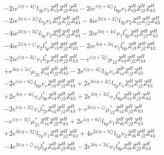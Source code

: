 \begin{align}
 &-2 i e^{i \Big(\eta +4 \zeta \Big)} l_{3p} v_1 Z_{{i 3}}^{H} Z_{{j 2}}^{H} Z_{{k 3}}^{H} -2 i e^{i \Big(\eta +6 \zeta \Big)} l_{6p} v_1 Z_{{i 3}}^{H} Z_{{j 2}}^{H} Z_{{k 3}}^{H} \nonumber \\ 
 &-2 i e^{3 i \Big(\eta +2 \zeta \Big)} l_{7p} v_1 Z_{{i 3}}^{H} Z_{{j 2}}^{H} Z_{{k 3}}^{H} -4 i e^{2 i \Big(\eta +2 \zeta \Big)} l_{2p} v_2 Z_{{i 3}}^{H} Z_{{j 2}}^{H} Z_{{k 3}}^{H} \nonumber \\ 
 &-4 i e^{2 i \Big(\eta +3 \zeta \Big)} l_{5p} v_2 Z_{{i 3}}^{H} Z_{{j 2}}^{H} Z_{{k 3}}^{H} -2 i e^{3 i \eta +4 i \zeta } v_1 l_{3p}^* Z_{{i 3}}^{H} Z_{{j 2}}^{H} Z_{{k 3}}^{H} \nonumber \\ 
 &-4 i e^{2 i \Big(\eta +\zeta \Big)} v_2 l_{5p}^* Z_{{i 3}}^{H} Z_{{j 2}}^{H} Z_{{k 3}}^{H} -2 i e^{3 i \eta +2 i \zeta } v_1 l_{6p}^* Z_{{i 3}}^{H} Z_{{j 2}}^{H} Z_{{k 3}}^{H} \nonumber \\ 
 &-2 i e^{i \Big(\eta +2 \zeta \Big)} v_1 l_{7p}^* Z_{{i 3}}^{H} Z_{{j 2}}^{H} Z_{{k 3}}^{H} - e^{i \Big(\eta +5 \zeta \Big)} \mu_{12} Z_{{i 4}}^{H} Z_{{j 2}}^{H} Z_{{k 3}}^{H} \nonumber \\ 
 &+e^{3 i \eta +5 i \zeta } \mu_{21} Z_{{i 4}}^{H} Z_{{j 2}}^{H} Z_{{k 3}}^{H} -2 e^{i \Big(\eta +4 \zeta \Big)} l_{3p} v_s Z_{{i 4}}^{H} Z_{{j 2}}^{H} Z_{{k 3}}^{H} \nonumber \\ 
 &-2 e^{i \Big(\eta +6 \zeta \Big)} l_{6p} v_s Z_{{i 4}}^{H} Z_{{j 2}}^{H} Z_{{k 3}}^{H} +2 e^{3 i \Big(\eta +2 \zeta \Big)} l_{7p} v_s Z_{{i 4}}^{H} Z_{{j 2}}^{H} Z_{{k 3}}^{H} \nonumber \\ 
 &+2 e^{3 i \eta +4 i \zeta } v_s l_{3p}^* Z_{{i 4}}^{H} Z_{{j 2}}^{H} Z_{{k 3}}^{H} +2 e^{3 i \eta +2 i \zeta } v_s l_{6p}^* Z_{{i 4}}^{H} Z_{{j 2}}^{H} Z_{{k 3}}^{H} \nonumber \\ 
 &-2 e^{i \Big(\eta +2 \zeta \Big)} v_s l_{7p}^* Z_{{i 4}}^{H} Z_{{j 2}}^{H} Z_{{k 3}}^{H} +e^{3 i \Big(\eta +\zeta \Big)} \mu_{12}^* Z_{{i 4}}^{H} Z_{{j 2}}^{H} Z_{{k 3}}^{H} \nonumber \\ 
 &- e^{i \Big(\eta +3 \zeta \Big)} \mu_{21}^* Z_{{i 4}}^{H} Z_{{j 2}}^{H} Z_{{k 3}}^{H} +2 e^{i \Big(\eta +6 \zeta \Big)} l_{6p} v_1 Z_{{i 6}}^{H} Z_{{j 2}}^{H} Z_{{k 3}}^{H} \nonumber \\ 
 &+2 e^{3 i \Big(\eta +2 \zeta \Big)} l_{7p} v_1 Z_{{i 6}}^{H} Z_{{j 2}}^{H} Z_{{k 3}}^{H} +4 e^{2 i \Big(\eta +3 \zeta \Big)} l_{5p} v_2 Z_{{i 6}}^{H} Z_{{j 2}}^{H} Z_{{k 3}}^{H} \nonumber \\ 
 &-4 e^{2 i \Big(\eta +\zeta \Big)} v_2 l_{5p}^* Z_{{i 6}}^{H} Z_{{j 2}}^{H} Z_{{k 3}}^{H} -2 e^{3 i \eta +2 i \zeta } v_1 l_{6p}^* Z_{{i 6}}^{H} Z_{{j 2}}^{H} Z_{{k 3}}^{H} \nonumber \\ 

\end{align}
